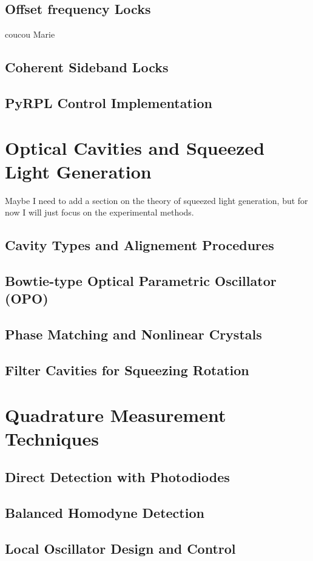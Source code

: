 \subsection{Offset frequency Locks}

coucou Marie 

\subsection{Coherent Sideband Locks}
\subsection{PyRPL Control Implementation}

\section{Optical Cavities and Squeezed Light Generation}
Maybe I need to add a section on the theory of squeezed light generation, but for now I will just focus on the experimental methods.
\subsection{Cavity Types and Alignement Procedures}


\subsection{Bowtie-type Optical Parametric Oscillator (OPO)}
\subsection{Phase Matching and Nonlinear Crystals}
\subsection{Filter Cavities for Squeezing Rotation}

\section{Quadrature Measurement Techniques}
\subsection{Direct Detection with Photodiodes}
\subsection{Balanced Homodyne Detection}
\subsection{Local Oscillator Design and Control}
\newpage
